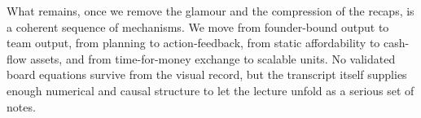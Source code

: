 What remains, once we remove the glamour and the compression of the recaps, is a coherent sequence of mechanisms. We move from founder-bound output to team output, from planning to action-feedback, from static affordability to cash-flow assets, and from time-for-money exchange to scalable units. No validated board equations survive from the visual record, but the transcript itself supplies enough numerical and causal structure to let the lecture unfold as a serious set of notes.